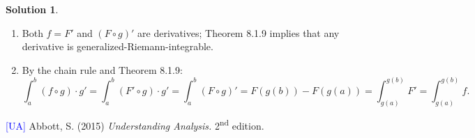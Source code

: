 \documentclass[12pt]{article}
\theoremstyle{definition}
\theoremstyle{exercise}
\theoremstyle{solution}
\newtheorem*{solution}{Solution}
\newcommand{\ts}{\textsuperscript}
\begin{document}
\begin{solution}
    \begin{enumerate}
        \item Both \( f = F' \) and \( (F \circ g)' \) are derivatives; Theorem 8.1.9 implies that any derivative is generalized-Riemann-integrable.

        \item By the chain rule and Theorem 8.1.9:
        \[
            \int_a^b (f \circ g) \cdot g' = \int_a^b (F' \circ g) \cdot g' = \int_a^b (F \circ g)' = F(g(b)) - F(g(a)) = \int_{g(a)}^{g(b)} F' = \int_{g(a)}^{g(b)} f.
        \]
    \end{enumerate}
\end{solution}

\noindent \hrulefill

\noindent \hypertarget{ua}{\textcolor{blue}{[UA]} Abbott, S. (2015) \textit{Understanding Analysis.} 2\ts{nd} edition.}
\end{document}
